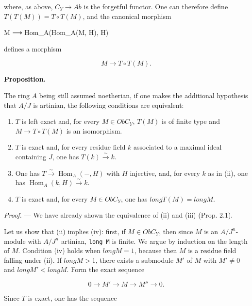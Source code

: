 \documentclass[
  11pt,
  a4paper,
]{book}
\newenvironment{Shaded}{}{}
\newcommand{\NormalTok}[1]{#1}
\providecommand{\tightlist}{%
  \setlength{\itemsep}{0pt}\setlength{\parskip}{0pt}}
\begin{document}
where, as above, \(C_{Y} \to Ab\) is the forgetful functor. One can
therefore define \(T(T(M)) = T \circ T(M)\), and the canonical morphism

\begin{Shaded}
\begin{Highlighting}[]
\NormalTok{M ⟶ Hom\_A(Hom\_A(M, H), H)}
\end{Highlighting}
\end{Shaded}

defines a morphism

\[ M \longrightarrow T \circ T(M). \]

\textbf{Proposition.}

The ring \(A\) being still assumed noetherian, if one makes the
additional hypothesis that \(A/J\) is artinian, the following conditions
are equivalent:

\begin{enumerate}
\def\labelenumi{\arabic{enumi}.}
\tightlist
\item
  \(T\) is left exact and, for every \(M \in Ob C_{Y}\), \(T(M)\) is of
  finite type and \(M \to T \circ T(M)\) is an isomorphism.
\item
  \(T\) is exact and, for every residue field \(k\) associated to a
  maximal ideal containing \(J\), one has \(T(k)
  \xrightarrow{\sim} k\).
\item
  One has \(T \xrightarrow{\sim} \operatorname{Hom}_{A}(-, H)\) with
  \(H\) injective, and, for every \(k\) as in (ii), one has
  \(\operatorname{Hom}_{A}(k, H) \xrightarrow{\sim} k\).
\item
  \(T\) is exact and, for every \(M \in Ob C_{Y}\), one has
  \(long T(M) = long M\).
\end{enumerate}

\emph{Proof.} --- We have already shown the equivalence of (ii) and
(iii) (Prop. 2.1).

Let us show that (ii) implies (iv): first, if \(M \in Ob C_{Y}\), then
since \(M\) is an \(A/J^{n}\)-module with \(A/J^{n}\) artinian,
\texttt{long\ M} is finite. We argue by induction on the length of
\(M\). Condition (iv) holds when \(long M = 1\), because then \(M\) is a
residue field falling under (ii). If \(long M > 1\), there exists a
submodule \(M'\) of \(M\) with \(M'
\neq 0\) and \(long M' < long M\). Form the exact sequence

\[ 0 \longrightarrow M' \longrightarrow M \longrightarrow M'' \longrightarrow 0. \]

Since \(T\) is exact, one has the sequence
\end{document}
